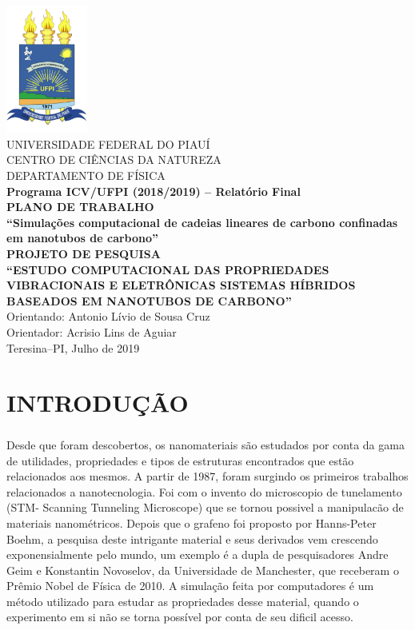 \documentclass[12pt,a4paper]{report}
\begin{document}
\fontsize{12pt}{17pt}\selectfont

\begin{titlepage}
\begin{center}
\includegraphics[width=0.2\textwidth]{./logo1.pdf}\\[0.2cm]
\textsc{UNIVERSIDADE FEDERAL DO PIAUÍ}\\[0.2cm]
\textsc{CENTRO DE CIÊNCIAS DA NATUREZA}\\[0.2cm]
\textsc{DEPARTAMENTO DE FÍSICA}\\[2.0cm]
{\textbf{Programa ICV/UFPI (2018/2019) – Relatório Final}}\\[1.0cm]
{\textbf{PLANO DE TRABALHO}}\\[0.4cm]
{\textbf{``Simulações computacional de cadeias lineares de carbono confinadas em nanotubos de carbono''}}\\[1.5cm]
{\textbf{PROJETO DE PESQUISA}}\\[0.4cm]
{\textbf{``ESTUDO COMPUTACIONAL DAS PROPRIEDADES VIBRACIONAIS E ELETRÔNICAS 
SISTEMAS HÍBRIDOS BASEADOS EM NANOTUBOS DE CARBONO''}}\\[2.0cm]

{Orientando: Antonio Lívio de Sousa Cruz}\\[1.0cm]
{Orientador: Acrisio Lins de Aguiar}\\[1.0cm]
{Teresina--PI, Julho de 2019}
\end{center}
\end{titlepage}
\setcounter{page}{2}

\chapter*{INTRODUÇÃO}
\paragraph{}
Desde que foram descobertos, os nanomateriais são estudados por conta da gama de utilidades, propriedades e tipos de estruturas encontrados que estão relacionados aos mesmos. A partir de 1987, foram surgindo os primeiros trabalhos relacionados a nanotecnologia. Foi com o invento do microscopio de tunelamento (STM- Scanning Tunneling Microscope) que se tornou possivel a manipulacão de materiais nanométricos. Depois que o grafeno foi proposto por  Hanns-Peter Boehm, a pesquisa deste intrigante material e seus derivados vem crescendo exponensialmente pelo mundo, um exemplo é a dupla de pesquisadores Andre Geim e Konstantin Novoselov, da Universidade de Manchester, que receberam o Prêmio Nobel de Física de 2010. A simulação feita por computadores é um método utilizado para estudar as propriedades desse material, quando o experimento em si não se torna possível por conta de seu dificil acesso.
\end{document}

